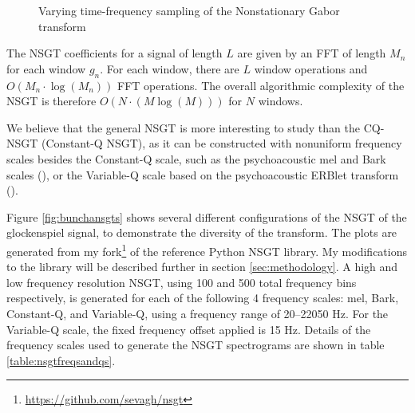 \documentclass[report.tex]{subfiles}
\begin{document}
\begin{figure}[ht]
	\centering
	\hspace{1em}
	\caption{Varying time-frequency sampling of the Nonstationary Gabor transform}
	\label{fig:nonuniformtflattices}
\end{figure}

The NSGT coefficients for a signal of length $L$ are given by an FFT of length $M_{n}$ for each window $g_{n}$. For each window, there are $L$ window operations and $O(M_{n} \cdot \log(M_{n}))$ FFT operations. The overall algorithmic complexity of the NSGT is therefore $O(N \cdot (M \log(M)))$ for $N$ windows.

We believe that the general NSGT is more interesting to study than the CQ-NSGT (Constant-Q NSGT), as it can be constructed with nonuniform frequency scales besides the Constant-Q scale, such as the psychoacoustic mel and Bark scales (\cite[Chapter~4]{melbook}), or the Variable-Q scale based on the psychoacoustic ERBlet transform (\cite{variableq1, variableq2}).

Figure \ref{fig:bunchansgts} shows several different configurations of the NSGT of the glockenspiel signal, to demonstrate the diversity of the transform. The plots are generated from my fork\footnote{\url{https://github.com/sevagh/nsgt}} of the reference Python NSGT library. My modifications to the library will be described further in section \ref{sec:methodology}. A high and low frequency resolution NSGT, using 100 and 500 total frequency bins respectively, is generated for each of the following 4 frequency scales: mel, Bark, Constant-Q, and Variable-Q, using a frequency range of 20--22050 Hz. For the Variable-Q scale, the fixed frequency offset applied is 15 Hz.  Details of the frequency scales used to generate the NSGT spectrograms are shown in table \ref{table:nsgtfreqsandqs}.
\end{document}
